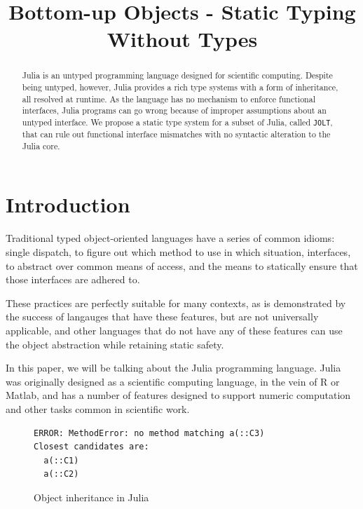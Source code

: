 \documentclass[preprint]{sigplanconf}
\newcommand{\xt}[1]{\texttt{#1}}
\newcommand{\jolt}{\xt{JOLT}}
\begin{document}
\title{Bottom-up Objects - Static Typing Without Types} 
\maketitle

\begin{abstract}
Julia is an untyped programming language designed for scientific computing. 
Despite being untyped, however, Julia provides a rich type systems with a form 
of inheritance, all resolved at runtime. As the language has no mechanism to 
enforce functional interfaces, Julia programs can go wrong because of improper
assumptions about an untyped interface. We propose a static type system for a 
subset of Julia, called \jolt, that can rule out functional interface mismatches
with no syntactic alteration to the Julia core.
\end{abstract}


\section{Introduction}

Traditional typed object-oriented languages have a series of
common idioms: single dispatch, to figure out which method
to use in which situation, interfaces, to abstract over 
common means of access, and the means to statically
ensure that those interfaces are adhered to.

These practices are perfectly suitable for many contexts,
as is demonstrated by the success of langauges that have 
these features, but are not universally applicable, and
other languages that do not have any of these features
can use the object abstraction while retaining static 
safety.

In this paper, we will be talking about the Julia
programming language. Julia was originally designed
as a scientific computing language, in the vein of 
R or Matlab, and has a number of features designed
to support numeric computation and other tasks common
in scientific work.

\begin{figure}[h]


\begin{Verbatim}[fontsize=\small]
ERROR: MethodError: no method matching a(::C3)
Closest candidates are:
  a(::C1)
  a(::C2)
\end{Verbatim}
\caption{Object inheritance in Julia}
\label{code:broken}
\end{figure}
\end{document}
